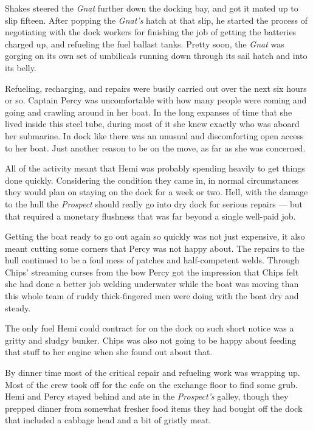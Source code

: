 \documentclass[
]{scrbook}
\begin{document}
Shakes steered the \emph{Gnat} further down the docking bay, and got it
mated up to slip fifteen. After popping the \emph{Gnat's} hatch at that
slip, he started the process of negotiating with the dock workers for
finishing the job of getting the batteries charged up, and refueling the
fuel ballast tanks. Pretty soon, the \emph{Gnat} was gorging on its own
set of umbilicals running down through its sail hatch and into its
belly.

Refueling, recharging, and repairs were busily carried out over the next
six hours or so. Captain Percy was uncomfortable with how many people
were coming and going and crawling around in her boat. In the long
expanses of time that she lived inside this steel tube, during most of
it she knew exactly who was aboard her submarine. In dock like there was
an unusual and discomforting open access to her boat. Just another
reason to be on the move, as far as she was concerned.

All of the activity meant that Hemi was probably spending heavily to get
things done quickly. Considering the condition they came in, in normal
circumstances they would plan on staying on the dock for a week or two.
Hell, with the damage to the hull the \emph{Prospect} should really go
into dry dock for serious repairs --- but that required a monetary
flushness that was far beyond a single well-paid job.

Getting the boat ready to go out again so quickly was not just
expensive, it also meant cutting some corners that Percy was not happy
about. The repairs to the hull continued to be a foul mess of patches
and half-competent welds. Through Chips' streaming curses from the bow
Percy got the impression that Chips felt she had done a better job
welding underwater while the boat was moving than this whole team of
ruddy thick-fingered men were doing with the boat dry and steady.

The only fuel Hemi could contract for on the dock on such short notice
was a gritty and sludgy bunker. Chips was also not going to be happy
about feeding that stuff to her engine when she found out about that.

By dinner time most of the critical repair and refueling work was
wrapping up. Most of the crew took off for the cafe on the exchange
floor to find some grub. Hemi and Percy stayed behind and ate in the
\emph{Prospect's} galley, though they prepped dinner from somewhat
fresher food items they had bought off the dock that included a cabbage
head and a bit of gristly meat.
\end{document}
